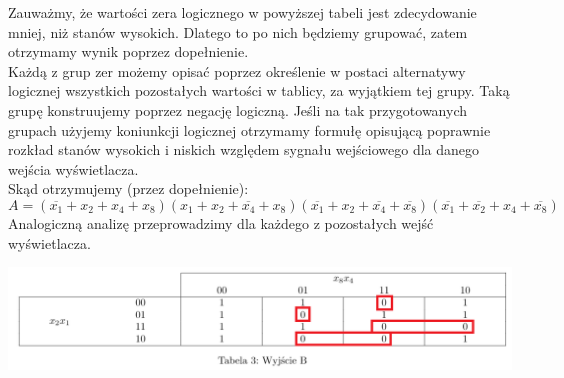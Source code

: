 \documentclass{article}
\begin{document}
                         
                        

            Zauważmy, że wartości zera logicznego w powyższej tabeli jest zdecydowanie mniej, niż stanów wysokich. Dlatego to po nich będziemy grupować, zatem otrzymamy wynik poprzez dopełnienie.\\
            Każdą z grup zer możemy opisać poprzez określenie w postaci alternatywy logicznej wszystkich pozostałych wartości w tablicy, za wyjątkiem tej grupy. Taką grupę konstruujemy poprzez negację logiczną. Jeśli na tak przygotowanych grupach użyjemy koniunkcji logicznej otrzymamy formułę opisującą poprawnie rozkład stanów wysokich i niskich względem sygnału wejściowego dla danego wejścia wyświetlacza. \\
            Skąd otrzymujemy (przez dopełnienie):
            $$A = (\overline{x_1}+x_2+x_4+x_8)(x_1+x_2+\overline{x_4}+x_8)(\overline{x_1}+x_2+\overline{x_4}+\overline{x_8})(\overline{x_1}+\overline{x_2}+x_4+\overline{x_8})$$
            Analogiczną analizę przeprowadzimy dla każdego z pozostałych wejść wyświetlacza.
            \begin{center}
                \includegraphics[width=18cm]{reports/img/Z1C_tab_3.png}\\
            \end{center}
                        
\end{document}
